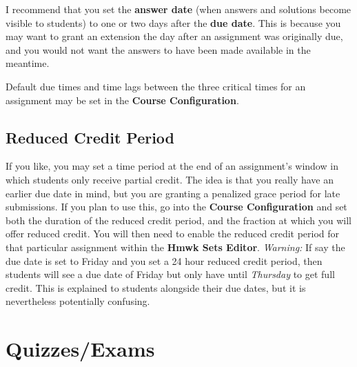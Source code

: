 \documentclass[12pt]{article}
\newcommand{\menu}[1]{\textbf{#1}}
\newcommand{\HSE}{\menu{Hmwk Sets Editor}}
\begin{document}
I recommend that you set the \menu{answer date} (when answers and solutions become visible to students) to one or two days after the \menu{due date}.  This is because you may want to grant an extension the day after an assignment was originally due, and you would not want the answers to have been made available in the meantime.

Default due times and time lags between the three critical times for an assignment may be set in the \menu{Course Configuration}.

\subsection{Reduced Credit Period}\label{reducedcredit}

If you like, you may set a time period at the end of an assignment's window in which students only receive partial credit. The idea is that you really have an earlier due date in mind, but you are granting a penalized grace period for late submissions. If you plan to use this, go into the \menu{Course Configuration} and set both the duration of the reduced credit period, and the fraction at which you will offer reduced credit. You will then need to enable the reduced credit period for that particular assignment within the \HSE. \emph{Warning:} If say the due date is set to Friday and you set a 24 hour reduced credit period, then students will see a due date of Friday but only have until \emph{Thursday} to get full credit. This is explained to students alongside their due dates, but it is nevertheless potentially confusing. 

\section{Quizzes/Exams}
\end{document}
